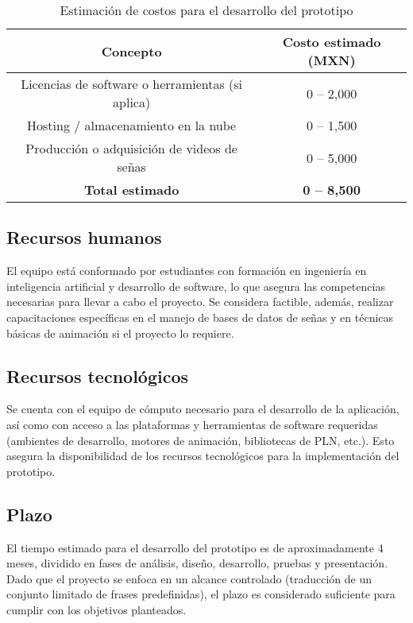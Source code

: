 \begin{table}[h!]
	\centering
	\begin{tabular}{|c|c|}
		\hline
		\textbf{Concepto}                    & \textbf{Costo estimado (MXN)} \\ \hline
		Licencias de software o herramientas (si aplica) & 0 -- 2,000                   \\ \hline
		Hosting / almacenamiento en la nube             & 0 -- 1,500                   \\ \hline
		Producción o adquisición de videos de señas     & 0 -- 5,000                   \\ \hline
		\textbf{Total estimado}                         & \textbf{0 -- 8,500}          \\ \hline
	\end{tabular}
	\caption{Estimación de costos para el desarrollo del prototipo}
\end{table}

\subsection{Recursos humanos}
El equipo está conformado por estudiantes con formación en ingeniería en inteligencia artificial y desarrollo de software, lo que asegura las competencias necesarias para llevar a cabo el proyecto. Se considera factible, además, realizar capacitaciones específicas en el manejo de bases de datos de señas y en técnicas básicas de animación si el proyecto lo requiere.

\subsection{Recursos tecnológicos}
Se cuenta con el equipo de cómputo necesario para el desarrollo de la aplicación, así como con acceso a las plataformas y herramientas de software requeridas (ambientes de desarrollo, motores de animación, bibliotecas de PLN, etc.). Esto asegura la disponibilidad de los recursos tecnológicos para la implementación del prototipo.

\subsection{Plazo}
El tiempo estimado para el desarrollo del prototipo es de aproximadamente 4 meses, dividido en fases de análisis, diseño, desarrollo, pruebas y presentación. Dado que el proyecto se enfoca en un alcance controlado (traducción de un conjunto limitado de frases predefinidas), el plazo es considerado suficiente para cumplir con los objetivos planteados.

